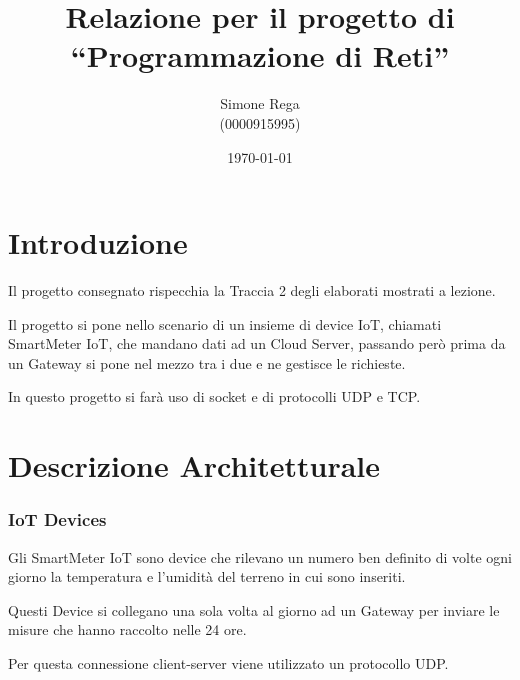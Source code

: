 \documentclass[a4paper,12pt]{report}
\title{Relazione per il progetto di\\``Programmazione di Reti''}
\author{Simone Rega \\ (0000915995)}
\date{\today}
\begin{document}
	
	\maketitle
	
	\tableofcontents
	
	\chapter{Introduzione}
	
	Il progetto consegnato rispecchia la Traccia 2 degli elaborati mostrati a lezione. 
	
	Il progetto si pone nello scenario di un insieme di device IoT, chiamati SmartMeter IoT, che mandano dati ad un Cloud Server, passando però prima da un Gateway si pone nel mezzo tra i due e ne gestisce le richieste.
	
	In questo progetto si farà uso di socket e di protocolli UDP e TCP.
	
	\chapter{Descrizione Architetturale}
	\subsection{IoT Devices}
	Gli SmartMeter IoT sono device che rilevano un numero ben definito di volte ogni giorno la temperatura e l'umidità del terreno in cui sono inseriti. 
	
	Questi Device si collegano una sola volta al giorno ad un Gateway per inviare le misure che hanno raccolto nelle 24 ore.
	
	Per questa connessione client-server viene utilizzato un protocollo UDP.
	
	\begin{figure}[!htb]
	\end{figure}
	
\end{document}

